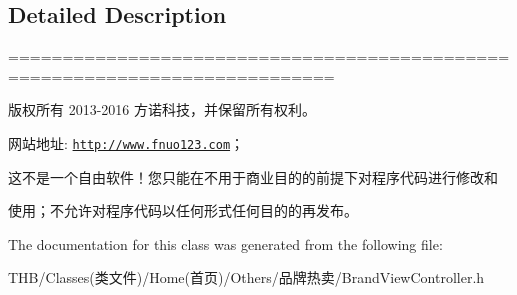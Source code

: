 \subsection{Detailed Description}
============================================================================

版权所有 2013-\/2016 方诺科技，并保留所有权利。

网站地址\+: \href{http://www.fnuo123.com}{\tt http\+://www.\+fnuo123.\+com}； 



这不是一个自由软件！您只能在不用于商业目的的前提下对程序代码进行修改和

使用；不允许对程序代码以任何形式任何目的的再发布。 

 

The documentation for this class was generated from the following file\+:\begin{DoxyCompactItemize}
\item 
T\+H\+B/\+Classes(类文件)/\+Home(首页)/\+Others/品牌热卖/Brand\+View\+Controller.\+h\end{DoxyCompactItemize}
